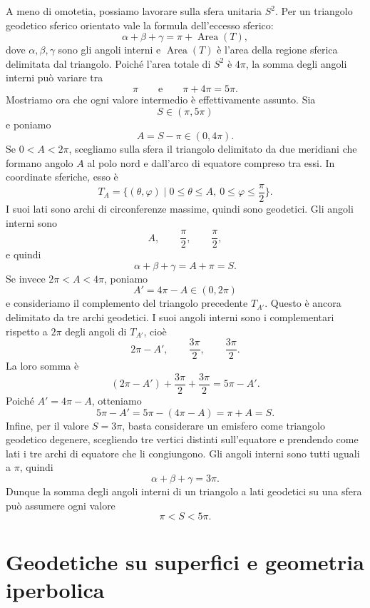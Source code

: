 \documentclass[a4paper]{article}
\begin{document}
\begin{snippetproof}{}
    A meno di omotetia, possiamo lavorare sulla sfera unitaria \(S^2\). Per un triangolo geodetico sferico orientato vale la formula dell'eccesso sferico:
    \[
        \alpha+\beta+\gamma
        =
        \pi+\operatorname{Area}(T),
    \]
    dove \(\alpha,\beta,\gamma\) sono gli angoli interni e \(\operatorname{Area}(T)\) è l'area della regione sferica delimitata dal triangolo. Poiché l'area totale di \(S^2\) è \(4\pi\), la somma degli angoli interni può variare tra
    \[
        \pi
        \qquad\text{e}\qquad
        \pi+4\pi=5\pi.
    \]
    Mostriamo ora che ogni valore intermedio è effettivamente assunto. Sia
    \[
        S\in(\pi,5\pi)
    \]
    e poniamo
    \[
        A=S-\pi\in(0,4\pi).
    \]
    Se \(0<A<2\pi\), scegliamo sulla sfera il triangolo delimitato da due meridiani che formano angolo \(A\) al polo nord e dall'arco di equatore compreso tra essi. In coordinate sferiche, esso è
    \[
        T_A=
        \{(\theta,\varphi)\mid 0\leq \theta\leq A,\ 0\leq \varphi\leq \frac{\pi}{2}\}.
    \]
    I suoi lati sono archi di circonferenze massime, quindi sono geodetici. Gli angoli interni sono
    \[
        A,\qquad \frac{\pi}{2},\qquad \frac{\pi}{2},
    \]
    e quindi
    \[
        \alpha+\beta+\gamma=A+\pi=S.
    \]
    Se invece \(2\pi<A<4\pi\), poniamo
    \[
        A'=4\pi-A\in(0,2\pi)
    \]
    e consideriamo il complemento del triangolo precedente \(T_{A'}\). Questo è ancora delimitato da tre archi geodetici. I suoi angoli interni sono i complementari rispetto a \(2\pi\) degli angoli di \(T_{A'}\), cioè
    \[
        2\pi-A',
        \qquad
        \frac{3\pi}{2},
        \qquad
        \frac{3\pi}{2}.
    \]
    La loro somma è
    \[
        (2\pi-A')+\frac{3\pi}{2}+\frac{3\pi}{2}
        =
        5\pi-A'.
    \]
    Poiché \(A'=4\pi-A\), otteniamo
    \[
        5\pi-A'
        =
        5\pi-(4\pi-A)
        =
        \pi+A
        =
        S.
    \]
    Infine, per il valore \(S=3\pi\), basta considerare un emisfero come triangolo geodetico degenere, scegliendo tre vertici distinti sull'equatore e prendendo come lati i tre archi di equatore che li congiungono. Gli angoli interni sono tutti uguali a \(\pi\), quindi
    \[
        \alpha+\beta+\gamma=3\pi.
    \]
    Dunque la somma degli angoli interni di un triangolo a lati geodetici su una sfera può assumere ogni valore
    \[
        \pi<S<5\pi.
    \]
\end{snippetproof}

\section{Geodetiche su superfici e geometria iperbolica}
\end{document}
